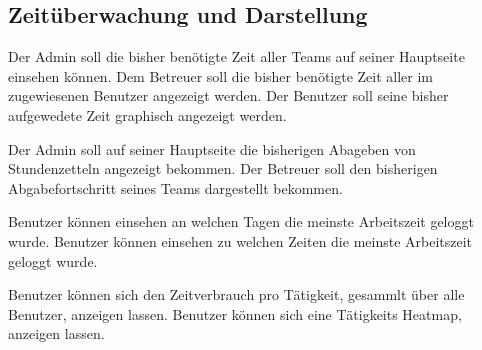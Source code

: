 \subsection{Zeitüberwachung und Darstellung}
    \begin{requirements}
        \begin{requirements}
             Der Admin soll die bisher benötigte Zeit aller Teams auf seiner Hauptseite einsehen können.
             Dem Betreuer soll die bisher benötigte Zeit aller im zugewiesenen Benutzer angezeigt werden.
             Der Benutzer soll seine bisher aufgewedete Zeit graphisch angezeigt werden.
        \end{requirements}

        \begin{requirements}
             Der Admin soll auf seiner Hauptseite die bisherigen Abageben von Stundenzetteln angezeigt bekommen.
             Der Betreuer soll den bisherigen Abgabefortschritt seines Teams dargestellt bekommen.
        \end{requirements}

        \begin{requirements}
             Benutzer können einsehen an welchen Tagen die meinste Arbeitszeit geloggt wurde.
             Benutzer können einsehen zu welchen Zeiten die meinste Arbeitszeit geloggt wurde.
        \end{requirements}

        \begin{requirements}
             Benutzer können sich den Zeitverbrauch pro Tätigkeit, gesammlt über alle Benutzer, anzeigen lassen.
             Benutzer können sich eine Tätigkeits Heatmap, anzeigen lassen.
        \end{requirements}

    \end{requirements}

